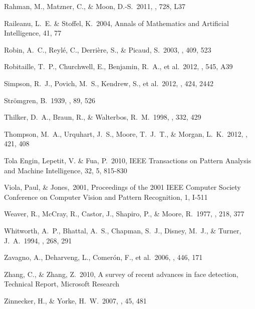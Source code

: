 \documentclass[preprint]{aastex}
\begin{document}
\begin{thebibliography}{16}
 Rahman, M., Matzner, C., 
\& Moon, D.-S.\ 2011, \apjl, 728, L37 

 Raileanu, L.~E. \& Stoffel, K.\ 2004, Annals of Mathematics and Artificial Intelligence, 41, 77

 Robin, A.~C., Reyl{\'e}, C., Derri{\`e}re, S., \& Picaud, S.\ 2003, \aap, 409, 523 

 Robitaille, T.~P., Churchwell, E., Benjamin, R.~A., et al.\ 2012, \aap, 545, A39 

 Simpson, R.~J., Povich, 
M.~S., Kendrew, S., et al.\ 2012, \mnras, 424, 2442 

 Str{\"o}mgren, B.\ 1939, 
\apj, 89, 526 

 Thilker, D.~A., Braun, R., \& Walterbos, R.~M.\ 1998, \aap, 332, 429 

 Thompson, M.~A., 
Urquhart, J.~S., Moore, T.~J.~T., \& Morgan, L.~K.\ 2012, \mnras, 421, 408 

Tola Engin, Lepetit, V. \& Fua, P.\ 2010, IEEE Transactions on Pattern Analysis and Machine Intelligence, 32, 5, 815-830

Viola, Paul, \& Jones,\ 2001, Proceedings of the 2001 IEEE Computer Society Conference on Computer Vision and Pattern Recognition, 1, I-511

 Weaver, R., McCray, R., 
Castor, J., Shapiro, P., \& Moore, R.\ 1977, \apj, 218, 377 

 Whitworth, A.~P., 
Bhattal, A.~S., Chapman, S.~J., Disney, M.~J., 
\& Turner, J.~A.\ 1994, \mnras, 268, 291 

 Zavagno, A., Deharveng, L., Comer{\'o}n, F., et al.\ 2006, \aap, 446, 171 

Zhang, C., \& Zhang, Z.\ 2010, A survey of recent advances in face detection, Technical Report, Microsoft Research

 Zinnecker, H., \& Yorke, H.~W.\ 2007, \araa, 45, 481 

\end{thebibliography}
\end{document}
